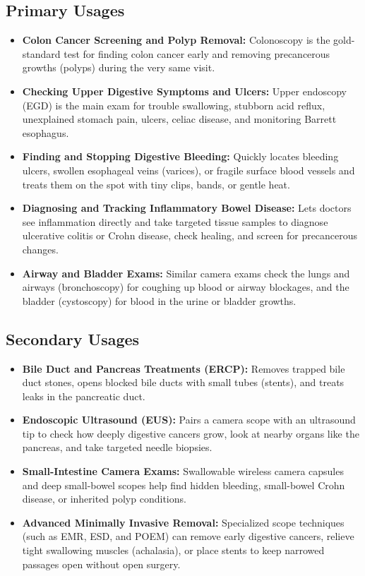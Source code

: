\subsection{Primary Usages}
\begin{itemize}
\item \textbf{Colon Cancer Screening and Polyp Removal:} Colonoscopy is the gold-standard test for finding colon cancer early and removing precancerous growths (polyps) during the very same visit.
\item \textbf{Checking Upper Digestive Symptoms and Ulcers:} Upper endoscopy (EGD) is the main exam for trouble swallowing, stubborn acid reflux, unexplained stomach pain, ulcers, celiac disease, and monitoring Barrett esophagus.
\item \textbf{Finding and Stopping Digestive Bleeding:} Quickly locates bleeding ulcers, swollen esophageal veins (varices), or fragile surface blood vessels and treats them on the spot with tiny clips, bands, or gentle heat.
\item \textbf{Diagnosing and Tracking Inflammatory Bowel Disease:} Lets doctors see inflammation directly and take targeted tissue samples to diagnose ulcerative colitis or Crohn disease, check healing, and screen for precancerous changes.
\item \textbf{Airway and Bladder Exams:} Similar camera exams check the lungs and airways (bronchoscopy) for coughing up blood or airway blockages, and the bladder (cystoscopy) for blood in the urine or bladder growths.
\end{itemize}

\subsection{Secondary Usages}
\begin{itemize}
\item \textbf{Bile Duct and Pancreas Treatments (ERCP):} Removes trapped bile duct stones, opens blocked bile ducts with small tubes (stents), and treats leaks in the pancreatic duct.
\item \textbf{Endoscopic Ultrasound (EUS):} Pairs a camera scope with an ultrasound tip to check how deeply digestive cancers grow, look at nearby organs like the pancreas, and take targeted needle biopsies.
\item \textbf{Small-Intestine Camera Exams:} Swallowable wireless camera capsules and deep small-bowel scopes help find hidden bleeding, small-bowel Crohn disease, or inherited polyp conditions.
\item \textbf{Advanced Minimally Invasive Removal:} Specialized scope techniques (such as EMR, ESD, and POEM) can remove early digestive cancers, relieve tight swallowing muscles (achalasia), or place stents to keep narrowed passages open without open surgery.
\end{itemize}



